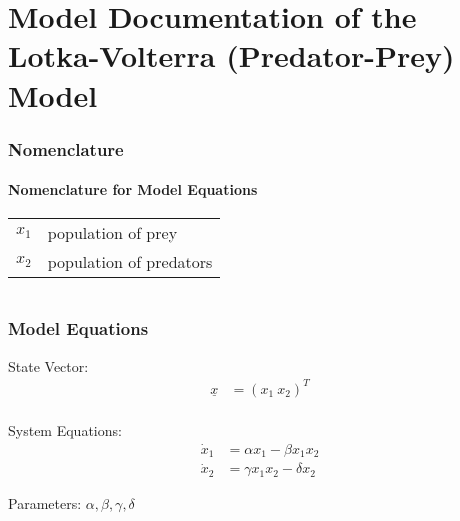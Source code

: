 \documentclass[10pt,a4paper]{article}
\begin{document}
	\part*{Model Documentation of the Lotka-Volterra (Predator-Prey) Model} %
	
	
	\section{Nomenclature} %
	\subsection{Nomenclature for Model Equations} %
	
	\begin{tabular}{ll}
		$x_1$ & population of prey \\
		$x_2$ & population of predators				
	\end{tabular}
	 
	
	\begin{tabular}{ll}

	\end{tabular}
	
	
	\section{Model Equations} %
	
	\noindent State Vector:
	\begin{align*}
		\underline{x} &= (x_1 \ x_2)^T \\
	\end{align*}
	
	\noindent System Equations:			
	\begin{subequations}
	\begin{align}
		\dot{x}_1 &= \alpha x_1 - \beta x_1 x_2 \\
		\dot{x}_2 &= \gamma x_1 x_2 - \delta x_2
	\end{align}
	\end{subequations}

	\noindent
	Parameters: $\alpha, \beta, \gamma, \delta$ %
	
\end{document}
